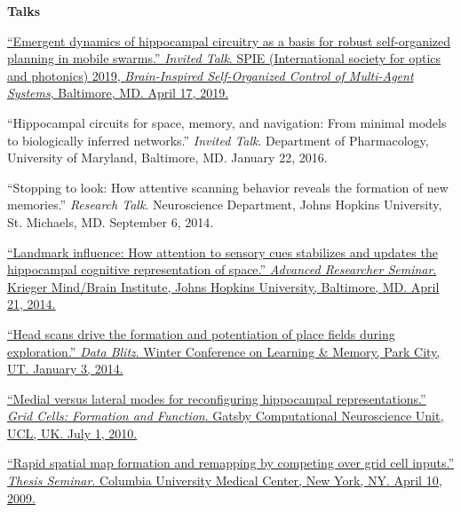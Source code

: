 \documentclass[10pt]{article}
\begin{document}
\begin{description}
\item \textbf{Talks}
\item[\quad]
\href{https://spie.org/SI/conferencedetails/micro-nanotechnology-sensors-systems
-applications?SSO=1#session-15}{``Emergent dynamics of hippocampal circuitry as
a basis for robust self-organized planning in mobile swarms.'' \emph{Invited
Talk}. SPIE (International society for optics and photonics) 2019,
\emph{Brain-Inspired Self-Organized Control of Multi-Agent Systems}, Baltimore,
MD. April 17, 2019.}
\item[\quad] ``Hippocampal circuits for space, memory, and navigation: From
minimal models to biologically inferred networks.'' \emph{Invited Talk}.
Department of Pharmacology, University of Maryland, Baltimore, MD. January 22,
2016.
\item[\quad] ``Stopping to look: How attentive scanning behavior reveals the
formation of new memories.'' \emph{Research Talk}. Neuroscience Department,
Johns Hopkins University, St. Michaels, MD. September 6, 2014.
\item[\quad]
\href{http://jdmonaco.com/files/mbi-seminar-abstract.pdf}{``Landmark influence:
How attention to sensory cues stabilizes and updates the hippocampal cognitive
representation of space.'' \emph{Advanced Researcher Seminar}. Krieger
Mind/Brain Institute, Johns Hopkins University, Baltimore, MD. April 21, 2014.}
\item[\quad] \href{http://jdmonaco.com/files/ScanningSlide.pdf}{``Head scans
drive the formation and potentiation of place fields during exploration.''
\emph{Data Blitz}. Winter Conference on Learning \& Memory, Park City, UT.
January 3, 2014.}
\item[\quad]
\href{http://www.gatsby.ucl.ac.uk/workshopjune2010/abstractmonaco.htm}{``Medial
versus lateral modes for reconfiguring hippocampal representations.'' \emph{Grid
Cells: Formation and Function}. Gatsby Computational Neuroscience Unit, UCL, UK.
July 1, 2010.}
\item[\quad] \href{http://dx.doi.org/10.6084/m9.figshare.693750}{``Rapid spatial
map formation and remapping by competing over grid cell inputs.'' \emph{Thesis
Seminar}. Columbia University Medical Center, New York, NY. April 10, 2009.}
\end{description}
\end{document}
